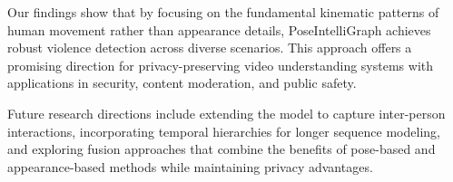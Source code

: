 \documentclass[conference]{IEEEtran}
\begin{document}
Our findings show that by focusing on the fundamental kinematic patterns of
human movement rather than appearance details, PoseIntelliGraph achieves robust
violence detection across diverse scenarios. This approach offers a promising
direction for privacy-preserving video understanding systems with applications
in security, content moderation, and public safety.

Future research directions include extending the model to capture inter-person
interactions, incorporating temporal hierarchies for longer sequence modeling,
and exploring fusion approaches that combine the benefits of pose-based and
appearance-based methods while maintaining privacy advantages.



\end{document}
